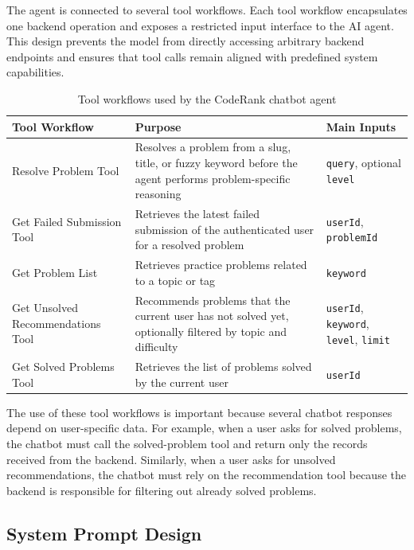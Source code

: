 The agent is connected to several tool workflows. Each tool workflow encapsulates one backend operation and exposes a restricted input interface to the AI agent. This design prevents the model from directly accessing arbitrary backend endpoints and ensures that tool calls remain aligned with predefined system capabilities.

\begin{table}[h]
\centering
\caption{Tool workflows used by the CodeRank chatbot agent}
\label{tab:chatbot-tool-workflows}
\renewcommand{\arraystretch}{1.25}
\begin{tabular}{|p{4.2cm}|p{5.2cm}|p{5.2cm}|}
\hline
\textbf{Tool Workflow} & \textbf{Purpose} & \textbf{Main Inputs} \\
\hline
Resolve Problem Tool & Resolves a problem from a slug, title, or fuzzy keyword before the agent performs problem-specific reasoning & \texttt{query}, optional \texttt{level} \\
\hline
Get Failed Submission Tool & Retrieves the latest failed submission of the authenticated user for a resolved problem & \texttt{userId}, \texttt{problemId} \\
\hline
Get Problem List & Retrieves practice problems related to a topic or tag & \texttt{keyword} \\
\hline
Get Unsolved Recommendations Tool & Recommends problems that the current user has not solved yet, optionally filtered by topic and difficulty & \texttt{userId}, \texttt{keyword}, \texttt{level}, \texttt{limit} \\
\hline
Get Solved Problems Tool & Retrieves the list of problems solved by the current user & \texttt{userId} \\
\hline
\end{tabular}
\end{table}

The use of these tool workflows is important because several chatbot responses depend on user-specific data. For example, when a user asks for solved problems, the chatbot must call the solved-problem tool and return only the records received from the backend. Similarly, when a user asks for unsolved recommendations, the chatbot must rely on the recommendation tool because the backend is responsible for filtering out already solved problems.

\subsection{System Prompt Design}

